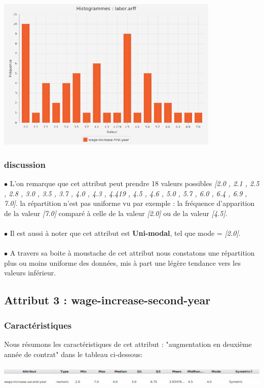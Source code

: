 \documentclass[12pt,a4paper,oneside]{book}
\begin{document}
\begin{center}
	\includegraphics[width=0.8\textwidth]{screens/barchart/wage-increase-first-year-barchart.png}%
	\label{labelname}%
\end{center}

\subsubsection{discussion}							
$\bullet $ L'on remarque que cet attribut peut prendre 18 valeurs possibles \textit{[2.0 , 2.1 , 2.5 , 2.8 , 3.0 , 3.5 , 3.7 , 4.0 , 4.3 , 4.419 , 4.5 , 4.6 , 5.0 , 5.7 , 6.0 , 6.4 , 6.9 , 7.0]}. la répartition n'est pas uniforme vu par exemple : la fréquence d'apparition de la valeur \textit{[7.0]} comparé à celle de la valeur \textit{[2.0]} ou de la valeur \textit{[4.5]}.\\
\textbf{ }\\
$\bullet $ Il est aussi à noter que cet attribut est \textbf{Uni-modal}, tel que mode = \textit{[2.0]}.\\
\textbf{ }\\
$\bullet $ A travers sa boite à moustache de cet attribut nous constatons une répartition plus ou moins uniforme des données, mis à part une légère tendance vers les valeurs inférieur.


\newpage


\subsection{Attribut 3 : wage-increase-second-year }
\subsubsection{Caractéristiques}
Nous résumons les caractéristiques de cet attribut : "augmentation en deuxième année de contrat" dans le tableau ci-dessous:
\begin{center}
	\includegraphics[width=1\textwidth]{screens/att.png}\\ \includegraphics[width=1\textwidth]{screens/att-3.png}%
	\label{labelname}%
\end{center}
\end{document}
